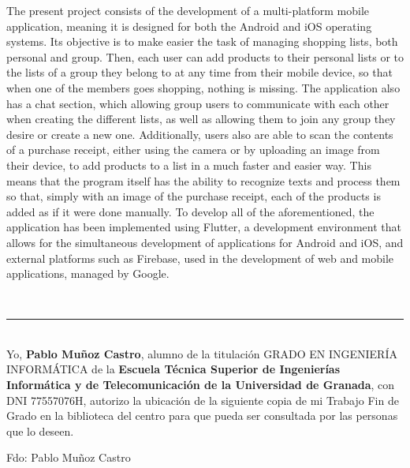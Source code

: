 The present project consists of the development of a multi-platform mobile application, meaning it is designed for both the Android and iOS operating systems. Its objective is to make easier the task of managing shopping lists, both personal and group. Then, each user can add products to their personal lists or to the lists of a group they belong to at any time from their mobile device, so that when one of the members goes shopping, nothing is missing. The application also has a chat section, which allowing group users to communicate with each other when creating the different lists, as well as allowing them to join any group they desire or create a new one. Additionally, users also are able to scan the contents of a purchase receipt, either using the camera or by uploading an image from their device, to add products to a list in a much faster and easier way. This means that the program itself has the ability to recognize texts and process them so that, simply with an image of the purchase receipt, each of the products is added as if it were done manually. To develop all of the aforementioned, the application has been implemented using Flutter, a development environment that allows for the simultaneous development of applications for Android and iOS, and external platforms such as Firebase, used in the development of web and mobile applications, managed by Google.

\vspace{0.7cm}

\\

\newpage

\noindent\rule[-1ex]{\textwidth}{2pt}\\[4.5ex]

Yo, \textbf{Pablo Muñoz Castro}, alumno de la titulación GRADO EN INGENIERÍA INFORMÁTICA de la \textbf{Escuela Técnica Superior de Ingenierías Informática y de Telecomunicación de la Universidad de Granada}, con DNI 77557076H, autorizo la ubicación de la siguiente copia de mi Trabajo Fin de Grado en la biblioteca del centro para que pueda ser consultada por las personas que lo deseen.

\vspace{2cm}

\noindent Fdo: Pablo Muñoz Castro

\vspace{2cm}


